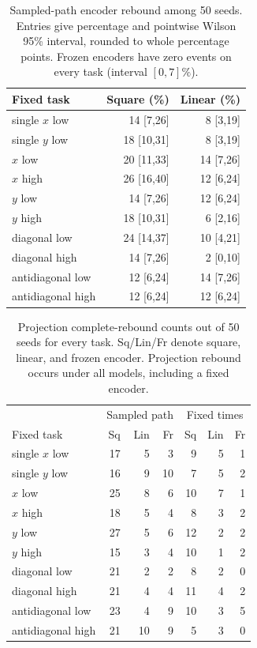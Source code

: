 \begin{table}[t]
\centering\small
\caption{Sampled-path encoder rebound among 50 seeds. Entries give percentage and pointwise Wilson 95\% interval, rounded to whole percentage points. Frozen encoders have zero events on every task (interval $[0,7]\%$).}
\label{supp:fifty-intervals}
\setlength{\tabcolsep}{3pt}
\begin{tabular}{lrr}
\toprule
Fixed task&Square (\%)&Linear (\%)\\\midrule
single $x$ low&14 [7,26]&8 [3,19]\\
single $y$ low&18 [10,31]&8 [3,19]\\
$x$ low&20 [11,33]&14 [7,26]\\
$x$ high&26 [16,40]&12 [6,24]\\
$y$ low&14 [7,26]&12 [6,24]\\
$y$ high&18 [10,31]&6 [2,16]\\
diagonal low&24 [14,37]&10 [4,21]\\
diagonal high&14 [7,26]&2 [0,10]\\
antidiagonal low&12 [6,24]&14 [7,26]\\
antidiagonal high&12 [6,24]&12 [6,24]\\\bottomrule
\end{tabular}
\end{table}

\begin{table}[t]
\centering\small
\caption{Projection complete-rebound counts out of 50 seeds for every task. Sq/Lin/Fr denote square, linear, and frozen encoder. Projection rebound occurs under all models, including a fixed encoder.}
\label{supp:fifty-projection}
\setlength{\tabcolsep}{3pt}
\begin{tabular}{lrrrrrr}
\toprule
&\multicolumn{3}{c}{Sampled path}&\multicolumn{3}{c}{Fixed times}\\
Fixed task&Sq&Lin&Fr&Sq&Lin&Fr\\\midrule
single $x$ low&17&5&3&9&5&1\\
single $y$ low&16&9&10&7&5&2\\
$x$ low&25&8&6&10&7&1\\
$x$ high&18&5&4&8&3&2\\
$y$ low&27&5&6&12&2&2\\
$y$ high&15&3&4&10&1&2\\
diagonal low&21&2&2&8&2&0\\
diagonal high&21&4&4&11&4&2\\
antidiagonal low&23&4&9&10&3&5\\
antidiagonal high&21&10&9&5&3&0\\\bottomrule
\end{tabular}
\end{table}

